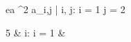 \begin{eqcode}{e}{a }{^2}{}
  a_{i,j} | i, j: i = 1 \cap j = 2 \gets
  \begin{cases}
    5 & i: i = 1  & \otherwise \lend
  \end{cases} \lend
\end{eqcode}
